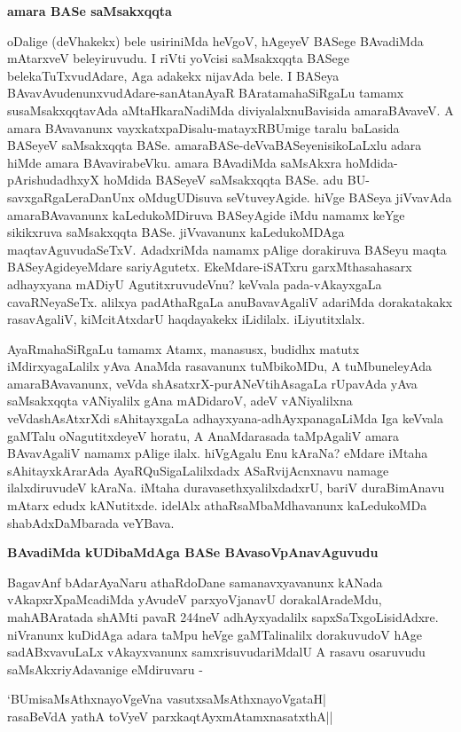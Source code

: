 \noindent
\textbf{amara BASe saMsakxqqta}

oDalige (deVhakekx) bele usiriniMda heVgoV, hAgeyeV BASege BAvadiMda mAtarxveV beleyiruvudu. I riVti yoVcisi saMsakxqqta BASege belekaTuTxvudAdare, Aga adakekx nijavAda bele. I BASeya BAvavAvudenunxvudAdare-sanAtanAyaR BAratamahaSiRgaLu tamamx susaMsakxqqtavAda aMtaHkaraNadiMda diviyalalxnuBavisida amaraBAvaveV. A amara BAvavanunx vayxkatxpaDisalu-matayxRBUmige taralu baLasida BASeyeV saMsakxqqta BASe. amaraBASe-deVvaBASeyenisikoLaLxlu adara hiMde amara BAvavirabeVku. amara BAvadiMda saMsAkxra hoMdida-pArishudadhxyX hoMdida BASeyeV saMsakxqqta BASe. adu BU-savxgaRgaLeraDanUnx oMdugUDisuva seVtuveyAgide. hiVge BASeya jiVvavAda amaraBAvavanunx kaLedukoMDiruva BASeyAgide iMdu namamx keYge sikikxruva saMsakxqqta BASe. jiVvavanunx kaLedukoMDAga maqtavAguvudaSeTxV. AdadxriMda namamx pAlige dorakiruva BASeyu maqta BASeyAgideyeMdare sariyAgutetx. EkeMdare-iSATxru garxMthasahasarx adhayxyana mADiyU AgutitxruvudeVnu? keVvala pada-vAkayxgaLa cavaRNeyaSeTx. alilxya padAthaRgaLa anuBavavAgaliV adariMda dorakatakakx rasavAgaliV, kiMcitAtxdarU haqdayakekx iLidilalx. iLiyutitxlalx. 

AyaRmahaSiRgaLu tamamx Atamx, manasusx, budidhx matutx iMdirxyagaLalilx yAva AnaMda rasavanunx tuMbikoMDu, A tuMbuneleyAda amaraBAvavanunx, veVda shAsatxrX-purANeVtihAsagaLa rUpavAda yAva saMsakxqqta vANiyalilx gAna mADidaroV, adeV vANiyalilxna veVdashAsAtxrXdi sAhitayxgaLa adhayxyana-adhAyxpanagaLiMda Iga keVvala gaMTalu oNagutitxdeyeV horatu, A AnaMdarasada taMpAgaliV amara BAvavAgaliV namamx pAlige ilalx. hiVgAgalu Enu kAraNa? eMdare iMtaha sAhitayxkArarAda AyaRQuSigaLalilxdadx ASaRvijAcnxnavu namage ilalxdiruvudeV kAraNa. iMtaha duravasethxyalilxdadxrU, bariV duraBimAnavu mAtarx edudx kANutitxde. idelAlx athaRsaMbaMdhavanunx kaLedukoMDa shabAdxDaMbarada veYBava.

\noindent
\textbf{BAvadiMda kUDibaMdAga BASe BAvasoVpAnavAguvudu}\label{page26}

BagavAnf bAdarAyaNaru athaRdoDane samanavxyavanunx kANada vAkapxrXpaMcadiMda yAvudeV parxyoVjanavU dorakalAradeMdu, mahABAratada shAMti pavaR 244neV adhAyxyadalilx sapxSaTxgoLisidAdxre. niVranunx kuDidAga adara taMpu heVge gaMTalinalilx dorakuvudoV hAge sadABxvavuLaLx vAkayxvanunx samxrisuvudariMdalU A rasavu osaruvudu saMsAkxriyAdavanige eMdiruvaru -

\begin{shloka}
`BUmisaMsAthxnayoVgeVna vasutxsaMsAthxnayoVgataH|\\\label{26}
rasaBeVdA yathA toVyeV parxkaqtAyxmAtamxnasatxthA||\\
\end{shloka}

